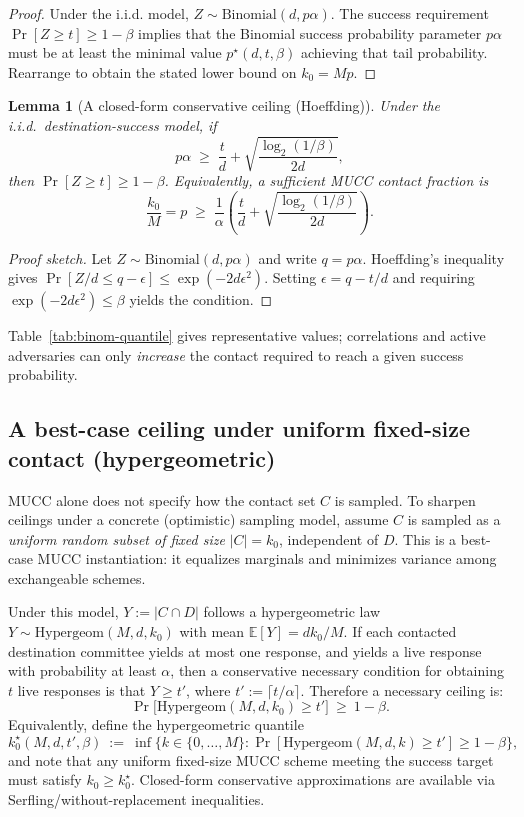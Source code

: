 \documentclass[11pt]{article}
\newtheorem{lemma}{Lemma}
\newcommand{\E}{\mathbb{E}}
\begin{document}
\begin{proof}
Under the i.i.d. model, $Z\sim\mathrm{Binomial}(d,p\alpha)$.
The success requirement $\Pr[Z\ge t]\ge 1-\beta$ implies that the Binomial success probability parameter $p\alpha$ must be at least the minimal value $p^\star(d,t,\beta)$ achieving that tail probability.
Rearrange to obtain the stated lower bound on $k_0=Mp$.
\end{proof}

\begin{lemma}[A closed-form conservative ceiling (Hoeffding)]
\label{lem:hoeffding-ceiling}
Under the i.i.d.\ destination-success model, if
\[
p\alpha \;\ge\; \frac{t}{d} + \sqrt{\frac{\log_2(1/\beta)}{2d}},
\]
then $\Pr[Z\ge t]\ge 1-\beta$.
Equivalently, a sufficient MUCC contact fraction is
\[
\frac{k_0}{M}=p \;\ge\; \frac{1}{\alpha}\left(\frac{t}{d} + \sqrt{\frac{\log_2(1/\beta)}{2d}}\right).
\]
\end{lemma}

\begin{proof}[Proof sketch]
Let $Z\sim\mathrm{Binomial}(d,p\alpha)$ and write $q=p\alpha$.
Hoeffding's inequality gives $\Pr[Z/d \le q-\epsilon]\le \exp(-2d\epsilon^2)$.
Setting $\epsilon = q - t/d$ and requiring $\exp(-2d\epsilon^2)\le\beta$ yields the condition.
\end{proof}

Table~\ref{tab:binom-quantile} gives representative values; correlations and active adversaries can only \emph{increase} the contact required to reach a given success probability.

\subsection{A best-case ceiling under uniform fixed-size contact (hypergeometric)}
MUCC alone does not specify how the contact set $C$ is sampled.
To sharpen ceilings under a concrete (optimistic) sampling model, assume $C$ is sampled as a \emph{uniform random subset of fixed size} $|C|=k_0$, independent of $D$.
This is a best-case MUCC instantiation: it equalizes marginals and minimizes variance among exchangeable schemes.

Under this model, $Y:=|C\cap D|$ follows a hypergeometric law $Y\sim \mathrm{Hypergeom}(M,d,k_0)$ with mean $\E[Y]=dk_0/M$.
If each contacted destination committee yields at most one response, and yields a live response with probability at least $\alpha$, then a conservative necessary condition for obtaining $t$ live responses is that $Y\ge t'$, where $t':=\lceil t/\alpha\rceil$.
Therefore a necessary ceiling is:
\[
\Pr\!\bigl[\mathrm{Hypergeom}(M,d,k_0)\ge t'\bigr]\ \ge\ 1-\beta.
\]
Equivalently, define the hypergeometric quantile
\[
k_0^{\star}(M,d,t',\beta)\ :=\ \inf\{k\in\{0,\dots,M\}:\Pr[\mathrm{Hypergeom}(M,d,k)\ge t']\ge 1-\beta\},
\]
and note that any uniform fixed-size MUCC scheme meeting the success target must satisfy $k_0\ge k_0^\star$.
Closed-form conservative approximations are available via Serfling/without-replacement inequalities.\cite{serfling1974sampling,bardenet2015withoutreplacement}
\end{document}
